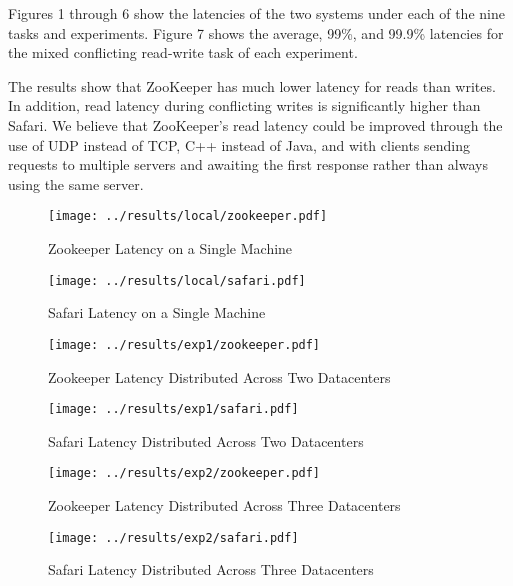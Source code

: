 Figures 1 through 6 show the latencies of the two systems under each of the nine tasks and
experiments. Figure 7 shows the average, 99\%, and 99.9\% latencies for the mixed conflicting
read-write task of each experiment.

The results show that ZooKeeper has much lower latency for reads than writes. In addition, read
latency during conflicting writes is significantly higher than Safari. We believe that ZooKeeper's
read latency could be improved through the use of UDP instead of TCP, C++ instead of Java, and with
clients sending requests to multiple servers and awaiting the first response rather than always
using the same server.

\begin{figure}[h]
  \caption{Zookeeper Latency on a Single Machine}
  \centering
  \texttt{[image: ../results/local/zookeeper.pdf]}
\end{figure}

\begin{figure}[h]
  \caption{Safari Latency on a Single Machine}
  \centering
  \texttt{[image: ../results/local/safari.pdf]}
\end{figure}


\begin{figure}[h]
  \caption{Zookeeper Latency Distributed Across Two Datacenters}
  \centering
  \texttt{[image: ../results/exp1/zookeeper.pdf]}
\end{figure}

\begin{figure}[h]
  \caption{Safari Latency Distributed Across Two Datacenters}
  \centering
  \texttt{[image: ../results/exp1/safari.pdf]}
\end{figure}

\begin{figure}[h]
  \caption{Zookeeper Latency Distributed Across Three Datacenters}
  \centering
  \texttt{[image: ../results/exp2/zookeeper.pdf]}
\end{figure}

\begin{figure}[h]
  \caption{Safari Latency Distributed Across Three Datacenters}
  \centering
  \texttt{[image: ../results/exp2/safari.pdf]}
\end{figure}


